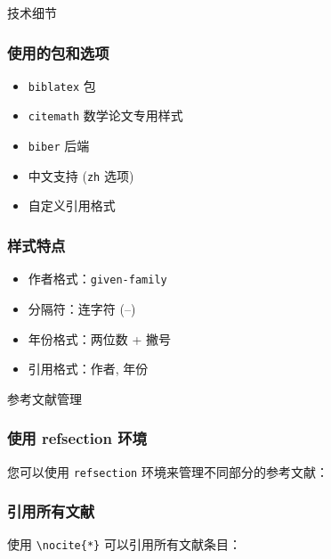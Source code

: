 \documentclass[biblatex,citemath,zh]{ustcmb}
\begin{document}
\begin{frame}{技术细节}
  \frametitle{使用的包和选项}
  
  \begin{itemize}
    \item \texttt{biblatex} 包
    \item \texttt{citemath} 数学论文专用样式
    \item \texttt{biber} 后端
    \item 中文支持 (\texttt{zh} 选项)
    \item 自定义引用格式
  \end{itemize}
  
  \vspace{1em}
  
  \frametitle{样式特点}
  
  \begin{itemize}
    \item 作者格式：\texttt{given-family}
    \item 分隔符：连字符 (--)
    \item 年份格式：两位数 + 撇号
    \item 引用格式：作者, 年份
  \end{itemize}
\end{frame}

\begin{frame}{参考文献管理}
  \frametitle{使用 refsection 环境}
  
  您可以使用 \texttt{refsection} 环境来管理不同部分的参考文献：
  
  \begin{MBrefsection}
    \nocite{AtiyahBott1983Yang}
    \printbibliography[heading=subbibliography,title=经典文献]
  \end{MBrefsection}
  
  \vspace{1em}
  
  \frametitle{引用所有文献}
  
  使用 \texttt{\textbackslash nocite\{*\}} 可以引用所有文献条目：
  
  \nocite{*}
\end{frame}

\end{document}
